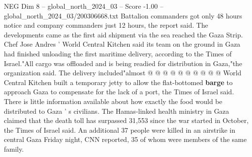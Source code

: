 \begin{textsample}{NEG Dim 8 – global\_north\_2024\_03 – Score -1.00 – global\_north\_2024\_03/200306668.txt}
Battalion commanders got only 48 hours notice and company commanders just 12 hours, the report said.
The developments came as the first aid shipment via the sea reached the Gaza Strip.
Chef Jose Andres ' World Central Kitchen said its team on the ground in Gaza had finished unloading the first maritime delivery, according to the Times of Israel."All cargo was offloaded and is being readied for distribution in Gaza,"the organization said.
The delivery included"almost @ @ @ @ @ @ @ @ @ @ World Central Kitchen built a temporary jetty to allow the flat-bottomed \textbf{barge} to approach Gaza to compensate for the lack of a port, the Times of Israel said.
There is little information available about how exactly the food would be distributed to Gaza ' s civilians.
The Hamas-linked health ministry in Gaza claimed that the death toll has surpassed 31,553 since the war started in October, the Times of Israel said.
An additional 37 people were killed in an airstrike in central Gaza Friday night, CNN reported, 35 of whom were members of the same family.

\end{textsample}
